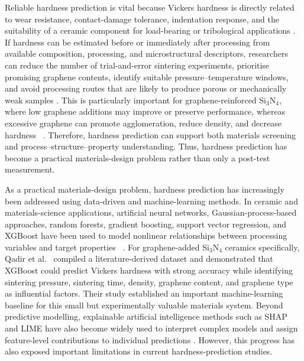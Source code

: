 \documentclass[pdflatex,sn-mathphys-num]{sn-jnl}%
\newif\ifrevmarks%
\newcommand{\revmark}[1]{\ifrevmarks\textcolor{revblue}{#1}\else#1\fi}%
\theoremstyle{thmstyleone}%
\theoremstyle{thmstyletwo}%
\theoremstyle{thmstylethree}%
\begin{document}
\revmark{Reliable hardness prediction is vital because Vickers hardness is directly related to wear resistance, contact-damage tolerance, indentation response, and the suitability of a ceramic component for load-bearing or tribological applications \cite{petzow2002silicon, qadir2018effect, ullner2001hardness}. If hardness can be estimated before or immediately after processing from available composition, processing, and microstructural descriptors, researchers can reduce the number of trial-and-error sintering experiments, prioritise promising graphene contents, identify suitable pressure--temperature windows, and avoid processing routes that are likely to produce porous or mechanically weak samples \cite{qadir2024predicting, balazsi2003preparation,chen2016xgboost}. This is particularly important for graphene-reinforced Si$_3$N$_4$, where low graphene additions may improve or preserve performance, whereas excessive graphene can promote agglomeration, reduce density, and decrease hardness~ \cite{qadir2024predicting, ramirez2014extraordinary}. Therefore, hardness prediction can support both materials screening and process--structure--property understanding. Thus, hardness prediction has become a practical materials-design problem rather than only a post-test measurement.}

As a practical materials-design problem, hardness prediction has increasingly been addressed using data-driven and machine-learning methods. In ceramic and materials-science applications, artificial neural networks, Gaussian-process-based approaches, random forests, gradient boosting, support vector regression, and XGBoost have been used to model nonlinear relationships between processing variables and target properties~ \cite{qu2019ultra, deng2018optimization, liu2020machine, butler2018machine, schmidt2019recent, ward2016general, ramprasad2017machine}. For graphene-added Si$_3$N$_4$ ceramics specifically, Qadir et al.~ \cite{qadir2024predicting} compiled a literature-derived dataset and demonstrated that XGBoost could predict Vickers hardness with strong accuracy while identifying sintering pressure, sintering time, density, graphene content, and graphene type as influential factors. Their study established an important machine-learning baseline for this small but experimentally valuable materials system. Beyond predictive modelling, explainable artificial intelligence methods such as SHAP and LIME have also become widely used to interpret complex models and assign feature-level contributions to individual predictions \cite{lundberg2017unified, ribeiro2016should}. However, this progress has also exposed important limitations in current hardness-prediction studies.
\end{document}
